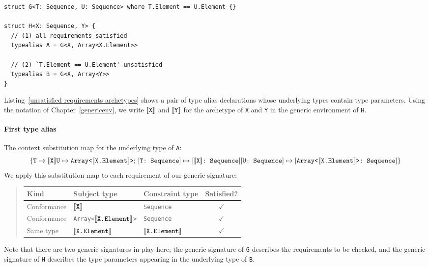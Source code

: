 \documentclass[../generics]{subfiles}
\begin{document}
\begin{listing}\label{unsatisfied requirements archetypes}
\begin{Verbatim}
struct G<T: Sequence, U: Sequence> where T.Element == U.Element {}

struct H<X: Sequence, Y> {
  // (1) all requirements satisfied
  typealias A = G<X, Array<X.Element>>

  // (2) `T.Element == U.Element' unsatisfied
  typealias B = G<X, Array<Y>>
}
\end{Verbatim}
\end{listing}
\begin{example}
Listing~\ref{unsatisfied requirements archetypes} shows a pair of type alias declarations whose underlying types contain type parameters. Using the notation of Chapter~\ref{genericenv}, we write $[\![\texttt{X}]\!]$ and $[\![\texttt{Y}]\!]$ for the archetype of \texttt{X} and \texttt{Y} in the generic environment of \texttt{H}.

\paragraph{First type alias} The context substitution map for the underlying type of \texttt{A}:
\[
\SubstMapC{
\SubstType{T}{$\archetype{X}$}\\
\SubstType{U}{Array<$\archetype{X.Element}$>}
}{
\SubstConf{T}{$\archetype{X}$}{Sequence}\\
\SubstConf{U}{Array<$\archetype{X.Element}$>}{Sequence}
}
\]
We apply this substitution map to each requirement of our generic signature:
\begin{quote}
\begin{tabular}{|l|l|l|c|}
\hline
Kind&Subject type&Constraint type&Satisfied?\\
\hline
Conformance&$[\![\texttt{X}]\!]$&\texttt{Sequence}&$\checkmark$\\
Conformance&\texttt{Array<$[\![\texttt{X.Element}]\!]$>}&\texttt{Sequence}&$\checkmark$\\
Same type&$[\![\texttt{X.Element}]\!]$&$[\![\texttt{X.Element}]\!]$&$\checkmark$\\
\hline
\end{tabular}
\end{quote}
Note that there are two generic signatures in play here; the generic signature of \texttt{G} describes the requirements to be checked, and the generic signature of \texttt{H} describes the type parameters appearing in the underlying type of \texttt{B}.


\end{example}
\end{document}
